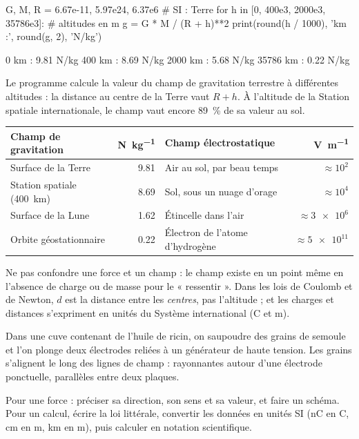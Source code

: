 \begin{python}
G, M, R = 6.67e-11, 5.97e24, 6.37e6        # SI : Terre
for h in [0, 400e3, 2000e3, 35786e3]:      # altitudes en m
    g = G * M / (R + h)**2
    print(round(h / 1000), 'km :', round(g, 2), 'N/kg')
\end{python}
\begin{console}
0 km : 9.81 N/kg
400 km : 8.69 N/kg
2000 km : 5.68 N/kg
35786 km : 0.22 N/kg
\end{console}
\noindent{} Le programme calcule la valeur du champ de gravitation terrestre à différentes altitudes : la
distance au centre de la Terre vaut $R+h$. À l'altitude de la Station spatiale internationale, le champ vaut encore
\qty{89}{\percent} de sa valeur au sol.
\begin{propriete}
\par\smallskip\noindent\hfill\begin{tabular}{lr@{\qquad}lr}
\toprule
Champ de gravitation & \unit{N.kg^{-1}} & Champ électrostatique & \unit{V.m^{-1}} \\
\midrule
Surface de la Terre & \num{9,81} & Air au sol, par beau temps & $\approx10^2$ \\
Station spatiale (\qty{400}{km}) & \num{8,69} & Sol, sous un nuage d'orage & $\approx10^4$ \\
Surface de la Lune & \num{1,62} & Étincelle dans l'air & $\approx\num{3e6}$ \\
Orbite géostationnaire & \num{0,22} & Électron de l'atome d'hydrogène & $\approx\num{5e11}$ \\
\bottomrule
\end{tabular}\hfill\null\par\smallskip
\end{propriete}
\begin{attention}
Ne pas confondre une force et un champ : le champ existe en un point même en l'absence de charge ou de masse pour le
« ressentir ». Dans les lois de Coulomb et de Newton, $d$ est la distance entre les \emph{centres}, pas l'altitude ; et les
charges et distances s'expriment en unités du Système international (C et m).
\end{attention}
\begin{experience}
Dans une cuve contenant de l'huile de ricin, on saupoudre des grains de semoule et l'on plonge deux électrodes reliées à
un générateur de haute tension. Les grains s'alignent le long des lignes de champ : rayonnantes autour d'une électrode
ponctuelle, parallèles entre deux plaques.
\end{experience}
\begin{rediger}
Pour une force : préciser sa direction, son sens et sa valeur, et faire un schéma. Pour un calcul, écrire la loi
littérale, convertir les données en unités SI (nC en C, cm en m, km en m), puis calculer en notation scientifique.
\end{rediger}
\exercices

